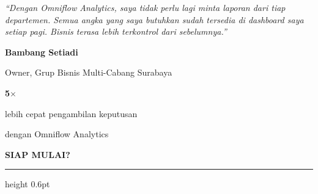 \documentclass[a4paper]{article}
\newcommand{\sectiontitle}[1]{%
    \vspace{10pt}%
    {\fontsize{13}{16}\selectfont\bfseries\color{BlueDark} #1}\par\vspace{3pt}%
    {\color{BluePrimary}\hrule height 0.6pt}\par\vspace{8pt}%
}
\begin{document}
\noindent
\begin{minipage}[t]{0.485\textwidth}
    \colorbox{BlueBg}{%
        \begin{minipage}{\dimexpr\linewidth-2\fboxsep\relax}
            {\fontsize{9.5}{13}\selectfont\color{TextDark}\textit{``Dengan Omniflow Analytics, saya tidak perlu lagi minta laporan dari tiap departemen. Semua angka yang saya butuhkan sudah tersedia di dashboard saya setiap pagi. Bisnis terasa lebih terkontrol dari sebelumnya.''}}\par\vspace{4pt}
            {\fontsize{8.5}{11}\selectfont\bfseries\color{BluePrimary} Bambang Setiadi}\par
            {\fontsize{8}{10}\selectfont\color{TextLight} Owner, Grup Bisnis Multi-Cabang Surabaya}
        \end{minipage}}
\end{minipage}%
\hfill
\begin{minipage}[t]{0.485\textwidth}
    \colorbox{BlueBg}{%
        \begin{minipage}{\dimexpr\linewidth-2\fboxsep\relax}
            \begin{center}
                {\fontsize{20}{24}\selectfont\bfseries\color{IndigoPrimary} 5$\times$}\par
                {\fontsize{9.5}{12}\selectfont\color{TextDark} lebih cepat pengambilan keputusan}\par
                {\fontsize{9.5}{12}\selectfont\color{TextDark} dengan Omniflow Analytics}
            \end{center}
        \end{minipage}}
\end{minipage}

\sectiontitle{SIAP MULAI?}
\end{document}
